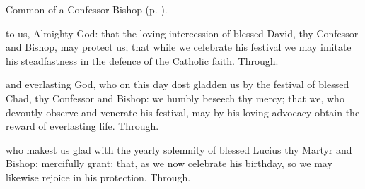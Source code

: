 \begin{rubric}
	Common of a Confessor Bishop (p. \pageref{CommonConfessorBishop}).
\end{rubric}





\memorialCollect
{} to us, Almighty God: that the loving intercession of blessed David, thy Confessor and Bishop, may protect us; that while we celebrate his festival we may imitate his steadfastness in the defence of the Catholic faith. Through.




\memorialCollect
{} and everlasting God, who on this day dost gladden us by the festival of blessed Chad, thy Confessor and Bishop: we humbly beseech thy mercy; that we, who devoutly observe and venerate his festival, may by his loving advocacy obtain the reward of everlasting life. Through.


\clearpage
{}


\memorialCollect
{} who makest us glad with the yearly solemnity of blessed Lucius thy Martyr and Bishop: mercifully grant; that, as we now celebrate his birthday, so we may likewise rejoice in his protection. Through.


